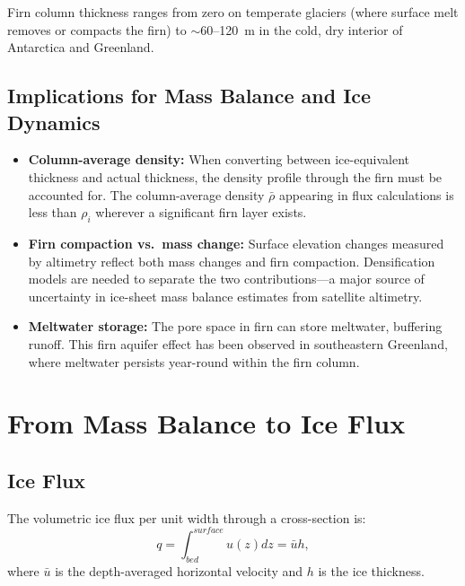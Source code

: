 \documentclass[11pt]{article}
\begin{document}
Firn column thickness ranges from zero on temperate glaciers (where surface melt removes or compacts the firn) to $\sim$60--120~m in the cold, dry interior of Antarctica and Greenland.

\subsection{Implications for Mass Balance and Ice Dynamics}

\begin{itemize}
  \item \textbf{Column-average density:} When converting between ice-equivalent thickness and actual thickness, the density profile through the firn must be accounted for.  The column-average density $\bar{\rho}$ appearing in flux calculations is less than $\rho_i$ wherever a significant firn layer exists.
  \item \textbf{Firn compaction vs.\ mass change:} Surface elevation changes measured by altimetry reflect both mass changes and firn compaction.  Densification models are needed to separate the two contributions---a major source of uncertainty in ice-sheet mass balance estimates from satellite altimetry.
  \item \textbf{Meltwater storage:} The pore space in firn can store meltwater, buffering runoff.  This firn aquifer effect has been observed in southeastern Greenland, where meltwater persists year-round within the firn column.
\end{itemize}

\section{From Mass Balance to Ice Flux}

\subsection{Ice Flux}

The volumetric ice flux per unit width through a cross-section is:
\begin{equation}
  q = \int_{bed}^{surface}u(z)dz = \bar{u}h,
\end{equation}
where $\bar{u}$ is the depth-averaged horizontal velocity and $h$ is the ice thickness.
\end{document}
